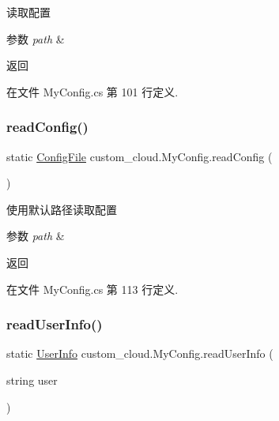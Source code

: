 读取配置 


\begin{DoxyParams}{参数}
{\em path} & \\
\hline
\end{DoxyParams}
\begin{DoxyReturn}{返回}

\end{DoxyReturn}


在文件 My\+Config.\+cs 第 101 行定义.

\mbox{\label{classcustom__cloud_1_1_my_config_a4f795561b0573449254c7c3e1946ae1d}} 
\subsubsection{\texorpdfstring{read\+Config()}{readConfig()}\hspace{0.1cm}{\footnotesize\ttfamily [2/2]}}
{\footnotesize\ttfamily static \hyperlink{classcustom__cloud_1_1_my_config_1_1_config_file}{Config\+File} custom\+\_\+cloud.\+My\+Config.\+read\+Config (\begin{DoxyParamCaption}{ }\end{DoxyParamCaption})\hspace{0.3cm}{\ttfamily [static]}}



使用默认路径读取配置 


\begin{DoxyParams}{参数}
{\em path} & \\
\hline
\end{DoxyParams}
\begin{DoxyReturn}{返回}

\end{DoxyReturn}


在文件 My\+Config.\+cs 第 113 行定义.

\mbox{\label{classcustom__cloud_1_1_my_config_a699557050983d928c0014ac372a0eb2f}} 
\subsubsection{\texorpdfstring{read\+User\+Info()}{readUserInfo()}}
{\footnotesize\ttfamily static \hyperlink{classcustom__cloud_1_1_user_info}{User\+Info} custom\+\_\+cloud.\+My\+Config.\+read\+User\+Info (\begin{DoxyParamCaption}\item[{string}]{user }\end{DoxyParamCaption})\hspace{0.3cm}{\ttfamily [static]}}



